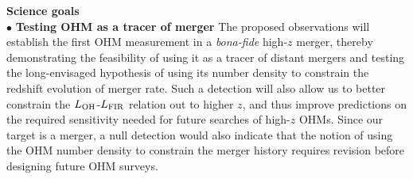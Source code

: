 \documentclass[letterpaper,11pt]{article}
\newcommand{\LFIR}{\mbox{$L_{\rm FIR}$}\xspace}
\newcommand{\LOH}{$L_{\rm OH}$\xspace}
\newcommand{\obs}{observations\xspace}
\begin{document}
\noindent \textbf{Science goals}
\vspace{.2em}\\
$\bullet$ {\bf Testing OHM as a tracer of merger}
The proposed \obs will establish the first OHM measurement in a {\it bona-fide} high-$z$ merger, thereby
demonstrating the feasibility of using it as a tracer of distant mergers and
testing the long-envisaged hypothesis of using its number density to constrain
the redshift evolution of merger rate.
Such a detection will also allow us to better constrain the
\LOH-\LFIR relation out to higher $z$, %
and thus improve predictions on the required sensitivity needed for future searches of high-$z$ OHMs.
Since our target is a merger,
a null detection would also indicate that the notion of
using the OHM number density to constrain the merger history requires revision before designing future OHM surveys.
\end{document}
